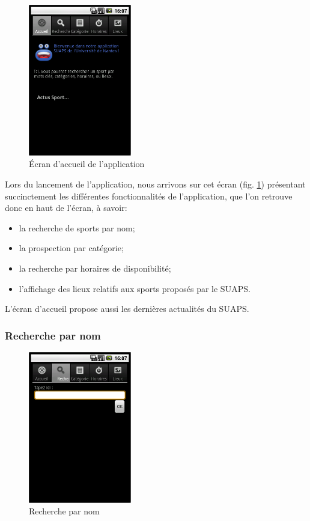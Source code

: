 \documentclass[french, titlepage, 11pt, a4paper]{article}
\begin{document}
		\begin{figure}[htb]
			\centering
			\includegraphics[width=0.4\textwidth]{accueil.png}
			\caption{Écran d'accueil de l'application}
			\label{fig:accueil}
		\end{figure}

		Lors du lancement de l'application, nous arrivons sur cet écran (fig. \ref{fig:accueil}) présentant
		succinctement les différentes fonctionnalités de l'application, que l'on
		retrouve donc en haut de l'écran, à savoir:

		\begin{itemize}
			\item la recherche de sports par nom;
			\item la prospection par catégorie;
			\item la recherche par horaires de disponibilité;
			\item l'affichage des lieux relatifs aux sports proposés par le SUAPS.
		\end{itemize}

		L'écran d'accueil propose aussi les dernières actualités du SUAPS.

		\subsubsection{Recherche par nom}

		\begin{figure}[htb]
			\centering
			\includegraphics[width=0.4\textwidth]{recherche.png}
			\caption{Recherche par nom}
			\label{fig:recherche}
		\end{figure}
\end{document}
